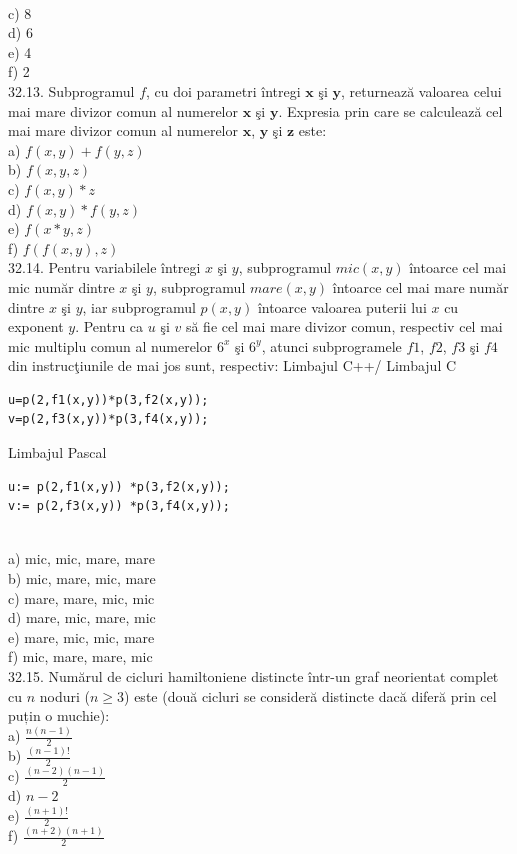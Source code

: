 \begin{itemize}
\begin{enumerate}
\\
c) 8
\\
d) 6
\\
e) 4
\\
f) 2
\\
32.13. Subprogramul $f$, cu doi parametri întregi $\mathbf{x}$ şi $\mathbf{y}$, returnează valoarea celui mai mare divizor comun al numerelor $\mathbf{x}$ şi $\mathbf{y}$. Expresia prin care se calculează cel mai mare divizor comun al numerelor $\mathbf{x}$, $\mathbf{y}$ şi $\mathbf{z}$ este:
\\
a) $f(x, y)+f(y, z)$
\\
b) $f(x, y, z)$
\\
c) $f(x, y) * z$
\\
d) $f(x, y) * f(y, z)$
\\
e) $f(x * y, z)$
\\
f) $f(f(x, y), z)$
\\
32.14. Pentru variabilele întregi $x$ şi $y$, subprogramul $mic(x, y)$ întoarce cel mai mic număr dintre $x$ şi $y$, subprogramul $mare(x, y)$ întoarce cel mai mare număr dintre $x$ şi $y$, iar subprogramul $p(x, y)$ întoarce valoarea puterii lui $x$ cu exponent $y$. Pentru ca $u$ şi $v$ să fie cel mai mare divizor comun, respectiv cel mai mic multiplu comun al numerelor $6^{x}$ şi $6^{y}$, atunci subprogramele $f1$, $f2$, $f3$ şi $f4$ din instrucţiunile de mai jos sunt, respectiv:
Limbajul C++/ Limbajul C
\begin{verbatim}
u=p(2,f1(x,y))*p(3,f2(x,y));
v=p(2,f3(x,y))*p(3,f4(x,y));
\end{verbatim}
Limbajul Pascal
\begin{verbatim}
u:= p(2,f1(x,y)) *p(3,f2(x,y));
v:= p(2,f3(x,y)) *p(3,f4(x,y));
\end{verbatim}
\\
a) mic, mic, mare, mare
\\
b) mic, mare, mic, mare
\\
c) mare, mare, mic, mic
\\
d) mare, mic, mare, mic
\\
e) mare, mic, mic, mare
\\
f) mic, mare, mare, mic
\\
32.15. Numărul de cicluri hamiltoniene distincte într-un graf neorientat complet cu $n$ noduri ($n \geq 3$) este (două cicluri se consideră distincte dacă diferă prin cel puțin o muchie):
\\
a) $\frac{n(n-1)}{2}$
\\
b) $\frac{(n-1)!}{2}$
\\
c) $\frac{(n-2)(n-1)}{2}$
\\
d) $n-2$
\\
e) $\frac{(n+1)!}{2}$
\\
f) $\frac{(n+2)(n+1)}{2}$
\\


\end{enumerate}
\end{itemize}
